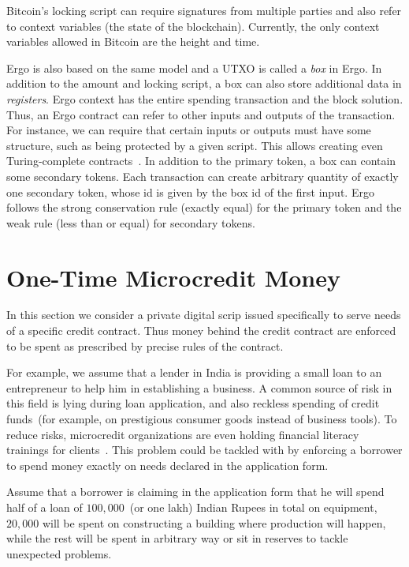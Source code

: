 \documentclass[]{llncs}   %
\begin{document}
Bitcoin's locking script can require signatures from multiple parties and also refer to context variables (the state of the blockchain). Currently, the only context variables allowed in Bitcoin are the height and time. 

Ergo is also based on the same model and a UTXO is called a {\em box} in Ergo. In addition to the amount and locking script, a box can also store additional data in {\em registers}. Ergo context has the entire spending transaction and the block solution. Thus, an Ergo contract can refer to other inputs and outputs of the transaction. For instance, we can require that certain inputs or outputs must have some structure, such as being protected by a given script. This allows creating even Turing-complete contracts~\cite{chepurnoy2018self}. In addition to the primary token, a box can contain some secondary tokens.
Each transaction can create arbitrary quantity of exactly one secondary token, whose id is given by the box id of the first input. Ergo follows the strong conservation rule (exactly equal) for the primary token and the weak rule (less than or equal) for secondary tokens. 

\section{One-Time Microcredit Money}
\label{sec-microcredit}

 In this section we consider a private digital scrip issued specifically to serve needs of a specific credit contract. Thus money behind the credit contract are enforced to be spent as prescribed by precise rules of the contract.

 For example, we assume that a lender in India is providing a small loan to an entrepreneur to help him in establishing a business.
 A common source of risk in this field is lying during loan application, and also reckless spending of credit funds~(for example, on prestigious consumer goods instead of business tools). To reduce risks, microcredit
 organizations are even holding financial literacy trainings for clients~\cite{finliteracy}. This problem could be tackled with by  enforcing a borrower to spend money exactly on needs declared in the application form.  

 Assume that a borrower is claiming in the application form that he will spend half of a loan of $100,000$~(or one lakh) 
 Indian Rupees in total on equipment, $20,000$ will be spent on constructing a building where production will happen, while the rest will be spent in arbitrary way or sit in reserves to tackle unexpected problems.
\end{document}
